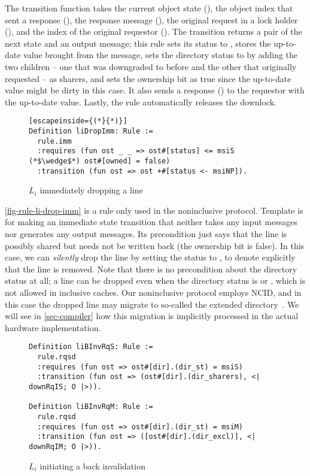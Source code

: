The transition function takes the current object state (), the object index that sent a response (), the response message (), the original request in a lock holder (), and the index of the original requestor ().
The transition returns a pair of the next state and an output message; this rule sets its status to \stS{}, stores the up-to-date value brought from the  message, sets the directory status to \stS{} by adding the two children -- one that was downgraded to \stS{} before and the other that originally requested \stS{} -- as sharers, and sets the ownership bit as true since the up-to-date value might be dirty in this case.
It also sends a response () to the requestor with the up-to-date value. Lastly, the rule automatically releases the downlock.

\begin{figure}[h]
  \centering
\begin{lstlisting}[escapeinside={(*}{*)}]
Definition liDropImm: Rule :=
  rule.imm
  :requires (fun ost _ _ => ost#[status] <= msiS (*$\wedge$*) ost#[owned] = false)
  :transition (fun ost => ost +#[status <- msiNP]).
\end{lstlisting}
  \caption{$L_i$ immediately dropping a line}
  \label{fig-rule-li-drop-imm}
\end{figure}

\autoref{fig-rule-li-drop-imm} is a rule only used in the noninclusive protocol.
Template  is for making an immediate state transition that neither takes any input messages nor generates any output messages.
Its precondition just says that the line is possibly shared but needs not be written back (the ownership bit is false).
In this case, we can \emph{silently} drop the line by setting the status to \stNP{}, to denote explicitly that the line is removed.
Note that there is no precondition about the directory status at all; a line can be dropped even when the directory status is \stS{} or \stM{}, which is not allowed in inclusive caches.
Our noninclusive protocol employs NCID, and in this case the dropped line may migrate to so-called the extended directory~\cite{Zhao:2010}.
We will see in \autoref{sec-compiler} how this migration is implicitly processed in the actual hardware implementation.

\begin{figure}[h]
  \centering
\begin{lstlisting}
Definition liBInvRqS: Rule :=
  rule.rqsd
  :requires (fun ost => ost#[dir].(dir_st) = msiS)
  :transition (fun ost => (ost#[dir].(dir_sharers), <| downRqIS; O |>)).

Definition liBInvRqM: Rule :=
  rule.rqsd
  :requires (fun ost => ost#[dir].(dir_st) = msiM)
  :transition (fun ost => ([ost#[dir].(dir_excl)], <| downRqIM; O |>)).
\end{lstlisting}
  \caption{$L_i$ initiating a back invalidation}
  \label{fig-rule-li-back-inv}
\end{figure}


